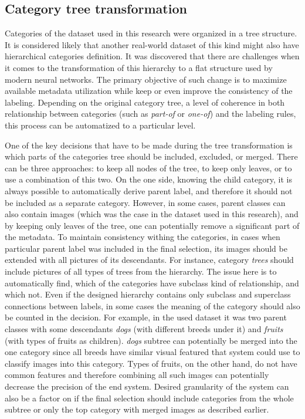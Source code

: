 \subsection{Category tree transformation}
Categories of the dataset used in this research were organized in a tree structure. It is considered likely that another real-world dataset of this kind might also have hierarchical categories definition. It was discovered that there are challenges when it comes to the transformation of this hierarchy to a flat structure used by modern neural networks. The primary objective of such change is to maximize available metadata utilization while keep or even improve the consistency of the labeling. Depending on the original category tree, a level of coherence in both relationship between categories (such as \textit{part-of} or \textit{one-of}) and the labeling rules, this process can be automatized to a particular level.

One of the key decisions that have to be made during the tree transformation is which parts of the categories tree should be included, excluded, or merged. There can be three approaches: to keep all nodes of the tree, to keep only leaves, or to use a combination of this two. On the one side, knowing the child category, it is always possible to automatically derive parent label, and therefore it should not be included as a separate category. However, in some cases, parent classes can also contain images (which was the case in the dataset used in this research), and by keeping only leaves of the tree, one can potentially remove a significant part of the metadata. To maintain consistency withing the categories, in cases when particular parent label was included in the final selection, its images should be extended with all pictures of its descendants.  For instance, category \textit{trees} should include pictures of all types of trees from the hierarchy. The issue here is to automatically find, which of the categories have subclass kind of relationship, and which not. Even if the designed hierarchy contains only subclass and superclass connections between labels, in some cases the meaning of the category should also be counted in the decision. For example, in the used dataset it was two parent classes with some descendants \textit{dogs} (with different breeds under it) and \textit{fruits} (with types of fruits as children). \textit{dogs} subtree can potentially be merged into the one category since all breeds have similar visual featured that system could use to classify images into this category. Types of fruits, on the other hand, do not have common features and therefore combining all such images can potentially decrease the precision of the end system. Desired granularity of the system can also be a factor on if the final selection should include categories from the whole subtree or only the top category with merged images as described earlier.

